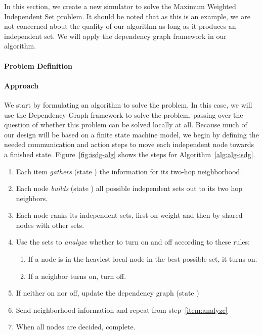 
\label{sec:sim-new}

In this section, we create a new simulator to solve the Maximum Weighted Independent Set problem. It should be noted that as this is an example, we are not concerned about the quality of our algorithm as long as it produces an independent set. We will apply the dependency graph framework in our algorithm.

\paragraph{Problem Definition}


\paragraph{Approach}

We start by formulating an algorithm to solve the problem. In this case, we will use the Dependency Graph framework to solve the problem, passing over the question of whether this problem can be solved locally at all. Because much of our design will be based on a finite state machine model, we begin by defining the needed communication and action steps to move each independent node towards a finished state. Figure~\ref{fig:isdg-alg} shows the steps for Algorithm~\ref{alg:alg-isdg}.

\begin{enumerate}
\item Each item {\em gathers} (state \cGd) the information for its two-hop neighborhood.
\item Each node {\em builds} (state \cBd) all possible independent sets out to its two hop neighbors.
\item Each node ranks its independent sets, first on weight and then by shared nodes with other sets.
\item Use the sets to {\em analyze} whether to turn on and off according to these rules: \label{item:analyze}
\begin{enumerate}
\item If a node is in the heaviest local node in the best possible set, it turns on.
\item If a neighbor turns on, turn off.
\end{enumerate}
\item If neither on nor off, update the dependency graph (state \cUd) 
\item Send neighborhood information and repeat from step~\ref{item:analyze}
\item When all nodes are decided, complete.
\end{enumerate}

